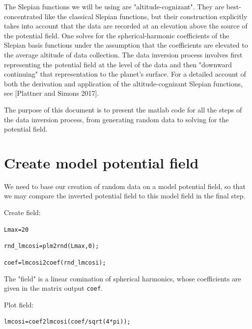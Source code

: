 \documentclass{article}
\begin{document}
The Slepian functions we will be using are "altitude-cognizant". They are best-concentrated like the classical Slepian functions, but their construction explicitly takes into account that the data are recorded at an elevation above the source of the potential field. One solves for the spherical-harmonic coefficients of the Slepian basis functions under the assumption that the coefficients are elevated to the average altitude of data collection. The data inversion process involves first representing the potential field at the level of the data and then "downward continuing" that representation to the planet's surface. For a detailed account of both the derivation and application of the altitude-cognizant Slepian functions, see [Plattner and Simons 2017]. 

The purpose of this document is to present the matlab code for all the steps of the data inversion process, from generating random data to solving for the potential field.

\section{Create model potential field}

We need to base our creation of random data on a model potential field, so that we may compare the inverted potential field to this model field in the final step.

\vspace{3mm}

\setlength{\parskip}{.1mm}

Create field:

\vspace{3mm}

\verb!Lmax=20 !

\verb!rnd_lmcosi=plm2rnd(Lmax,0);!

\verb!coef=lmcosi2coef(rnd_lmcosi);!

\setlength{\parskip}{0.5cm plus4mm minus3mm}

The "field" is a linear comination of spherical harmonics, whose coefficients are given in the matrix output \verb!coef!.

\vspace{3mm}

\setlength{\parskip}{.1mm}

Plot field:

\vspace{3mm}

\verb!lmcosi=coef2lmcosi(coef/sqrt(4*pi));!
\end{document}
